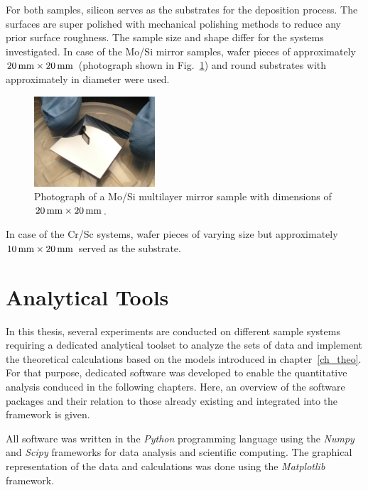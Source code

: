 For both samples, silicon serves as the substrates for the deposition process. The surfaces are super polished with mechanical polishing methods to reduce any prior surface roughness. The sample size and shape differ for the systems investigated. In case of the Mo/Si mirror samples, wafer pieces of approximately $\mm{20} \times \mm{20}$ (photograph shown in Fig.~\ref{ch_exp:fig_mosi_sample}) and round substrates with approximately  in diameter were used.
\begin{figure}[htb]
        \includegraphics[width=0.4\textwidth]{img/SAM_1910_v1}
        \caption[Mo/Si multilayer sample.]{%
            Photograph of a Mo/Si multilayer mirror sample with dimensions of $\mm{20} \times \mm{20}$.}
        \label{ch_exp:fig_mosi_sample}
\end{figure}
In case of the Cr/Sc systems, wafer pieces of varying size but approximately $\mm{10} \times \mm{20}$ served as the substrate.

\section{Analytical Tools}
In this thesis, several experiments are conducted on different sample systems requiring a dedicated analytical toolset to analyze the sets of data and implement the theoretical calculations based on the models introduced in chapter~\ref{ch_theo}. For that purpose, dedicated software was developed to enable the quantitative analysis conduced in the following chapters. Here, an overview of the software packages and their relation to those already existing and integrated into the framework is given.

All software was written in the \emph{Python} programming language using the \emph{Numpy} and \emph{Scipy} frameworks \cite{walt_numpy_2011} for data analysis and scientific computing. The graphical representation of the data and calculations was done using the \emph{Matplotlib} \cite{hunter_matplotlib:_2007} framework.

